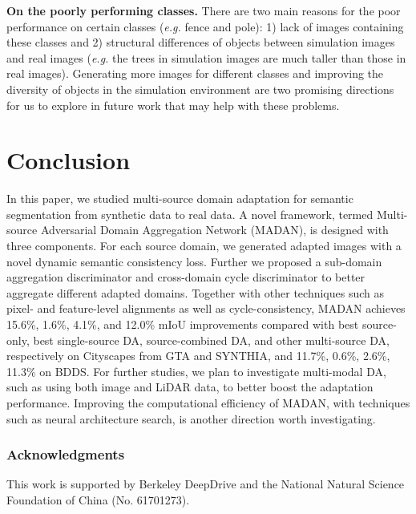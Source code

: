 \documentclass{article}
\begin{document}
\textbf{On the poorly performing classes. } There are two main reasons for the poor performance on certain classes (\textit{e.g.} fence and pole): 1) lack of images containing these classes and 2) structural differences of objects between simulation images and real images (\textit{e.g.} the trees in simulation images are much taller than those in real images). Generating more images for different classes and improving the diversity of objects in the simulation environment are two promising directions for us to explore in future work that may help with these problems.

\section{Conclusion}
In this paper, we studied multi-source domain adaptation for semantic segmentation from synthetic data to real data. A novel framework, termed Multi-source Adversarial Domain Aggregation Network (MADAN), is designed with three components. For each source domain, we generated adapted images with a novel dynamic semantic consistency loss. Further we proposed a sub-domain aggregation discriminator and cross-domain cycle discriminator to better aggregate different adapted domains. Together with other techniques such as pixel- and feature-level alignments as well as cycle-consistency, MADAN achieves 15.6\%, 1.6\%, 4.1\%, and 12.0\% mIoU improvements compared with best source-only, best single-source DA, source-combined DA, and other multi-source DA, respectively on Cityscapes from GTA and SYNTHIA, and 11.7\%, 0.6\%, 2.6\%, 11.3\% on BDDS. For further studies, we plan to investigate multi-modal DA, such as using both image and LiDAR data, to better boost the adaptation performance. Improving the computational efficiency of MADAN, with techniques such as neural architecture search, is another  direction worth investigating.




\clearpage
\subsubsection*{Acknowledgments}
This work is supported by Berkeley DeepDrive and the National Natural Science Foundation of China (No. 61701273).

{


}
\end{document}
